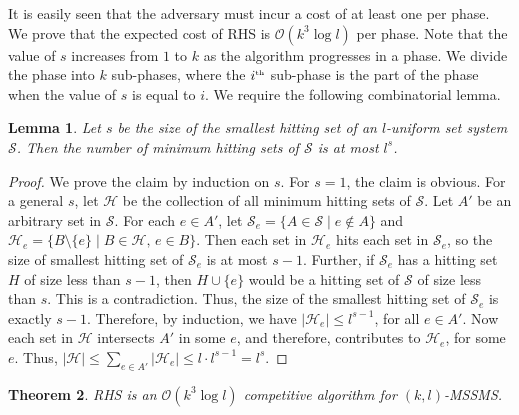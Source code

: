 \documentclass[11pt]{article}
\theoremstyle{plain}\newtheorem{theorem}{Theorem}
\newtheorem{lemma}[theorem]{Lemma}
\theoremstyle{definition}
\theoremstyle{remark}
\DeclareMathOperator{\suchthat}{\text{ }|\text{ }}
\begin{document}
It is easily seen that the adversary must incur a cost of at least one per phase. We prove that the expected cost of RHS is $\mathcal{O}(k^3\log l)$ per phase. Note that the value of $s$ increases from $1$ to $k$ as the algorithm progresses in a phase. We divide the phase into $k$ sub-phases, where the $i^{\text{\tiny{th}}}$ sub-phase is the part of the phase when the value of $s$ is equal to $i$. We require the following combinatorial lemma.


\begin{lemma}\label{lem_hittingset}
Let $s$ be the size of the smallest hitting set of an $l$-uniform set system $\mathcal{S}$. Then the number of minimum hitting sets of $\mathcal{S}$ is at most $l^s$.
\end{lemma}

\begin{proof}
We prove the claim by induction on $s$. For $s=1$, the claim is obvious. For a general $s$, let $\mathcal{H}$ be the collection of all minimum hitting sets of $\mathcal{S}$. Let $A'$ be an arbitrary set in $\mathcal{S}$. For each $e\in A'$, let $\mathcal{S}_e=\{A\in\mathcal{S}\suchthat e\notin A\}$ and $\mathcal{H}_e=\{B\setminus\{e\}\suchthat B\in\mathcal{H}\text{, }e\in B\}$. 
Then each set in $\mathcal{H}_e$ hits each set in $\mathcal{S}_e$, so the size of smallest hitting set of $\mathcal{S}_e$ is at most $s-1$. Further, if $\mathcal{S}_e$ has a hitting set $H$ of size less than $s-1$, then $H\cup\{e\}$ would be a hitting set of $\mathcal{S}$ of size less than $s$. This is a contradiction. Thus, the size of the smallest hitting set of $\mathcal{S}_e$ is exactly $s-1$. Therefore, by induction, we have $|\mathcal{H}_e|\leq l^{s-1}$, for all $e\in A'$. Now each set in $\mathcal{H}$ intersects $A'$ in some $e$, and therefore, contributes to $\mathcal{H}_e$, for some $e$. Thus, $|\mathcal{H}|\leq\sum_{e\in A'}|\mathcal{H}_e|\leq l\cdot l^{s-1}=l^s$.
\end{proof}

\begin{theorem}
RHS is an $\mathcal{O}(k^3\log l)$ competitive algorithm for $(k,l)$-MSSMS.
\end{theorem}
\end{document}

